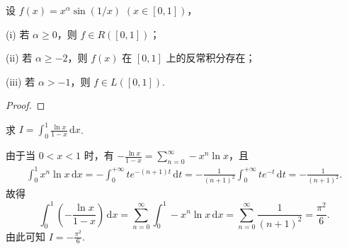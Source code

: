 \documentclass[../../main.tex]{subfiles}%
\begin{document}
\begin{example}
设 \( f(x) = x^{\alpha} \sin(1/x) \) \( (x \in [0, 1]) \)，

(i) 若 \( \alpha \geqslant  0 \)，则 \( f \in R([0, 1]) \)；

(ii) 若 \( \alpha \geqslant  -2 \)，则 \( f(x) \) 在 \( [0, 1] \) 上的反常积分存在；

(iii) 若 \( \alpha > -1 \)，则 \( f \in L([0, 1]) \).
\end{example}
\begin{proof}

\end{proof}

\begin{example}
求 \( I = \int_0^1 \frac{\ln x}{1 - x} \, \mathrm{d}x \).
\end{example}
\begin{solution}
由于当 \( 0 < x < 1 \) 时，有 \( -\frac{\ln x}{1 - x} = \sum_{n = 0}^{\infty} -x^n \ln x \)，且
\begin{align*}
\int_0^1 x^n \ln x \, \mathrm{d}x = -\int_0^{+\infty} t e^{-(n + 1)t} \, \mathrm{d}t = -\frac{1}{(n + 1)^2} \int_0^{+\infty} t e^{-t} \, \mathrm{d}t = -\frac{1}{(n + 1)^2}.
\end{align*}
故得
\[
\int_0^1 \left( -\frac{\ln x}{1 - x} \right) \, \mathrm{d}x = \sum_{n = 0}^{\infty} \int_0^1 -x^n \ln x \, \mathrm{d}x = \sum_{n = 0}^{\infty} \frac{1}{(n + 1)^2} = \frac{\pi^2}{6}.
\]
由此可知 \( I = -\frac{\pi^2}{6} \).

\end{solution}
\end{document}
